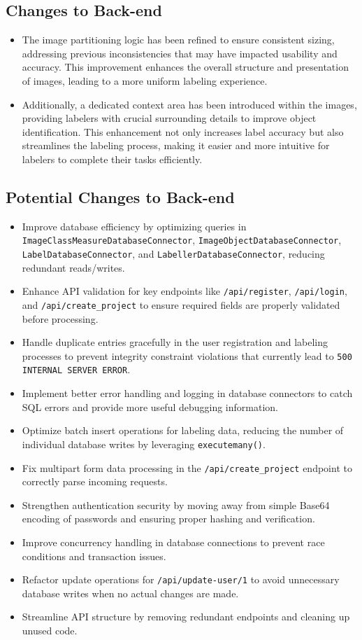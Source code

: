\documentclass[12pt, titlepage]{article}
\begin{document}
\subsection{Changes to Back-end}
\begin{itemize}
    \item The image partitioning logic has been refined to ensure consistent sizing, addressing previous inconsistencies that may have impacted usability and accuracy. This improvement enhances the overall structure and presentation of images, leading to a more uniform labeling experience.
    \item Additionally, a dedicated context area has been introduced within the images, providing labelers with crucial surrounding details to improve object identification. This enhancement not only increases label accuracy but also streamlines the labeling process, making it easier and more intuitive for labelers to complete their tasks efficiently.
\end{itemize}

\subsection{Potential Changes to Back-end}
\begin{itemize}
    \item Improve database efficiency by optimizing queries in \texttt{ImageClassMeasureDatabaseConnector}, \texttt{ImageObjectDatabaseConnector}, \texttt{LabelDatabaseConnector}, and \texttt{LabellerDatabaseConnector}, reducing redundant reads/writes.
    \item Enhance API validation for key endpoints like \texttt{/api/register}, \texttt{/api/login}, and \texttt{/api/create\_project} to ensure required fields are properly validated before processing.
    \item Handle duplicate entries gracefully in the user registration and labeling processes to prevent integrity constraint violations that currently lead to \texttt{500 INTERNAL SERVER ERROR}.
    \item Implement better error handling and logging in database connectors to catch SQL errors and provide more useful debugging information.
    \item Optimize batch insert operations for labeling data, reducing the number of individual database writes by leveraging \texttt{executemany()}.
    \item Fix multipart form data processing in the \texttt{/api/create\_project} endpoint to correctly parse incoming requests.
    \item Strengthen authentication security by moving away from simple Base64 encoding of passwords and ensuring proper hashing and verification.
    \item Improve concurrency handling in database connections to prevent race conditions and transaction issues.
    \item Refactor update operations for \texttt{/api/update-user/1} to avoid unnecessary database writes when no actual changes are made.
    \item Streamline API structure by removing redundant endpoints and cleaning up unused code.
\end{itemize}
\end{document}
